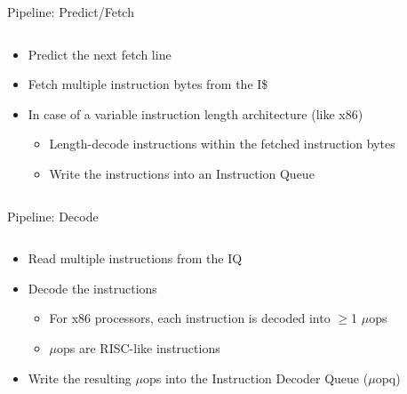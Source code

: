 \documentclass[aspectratio=169,12pt]{beamer}
\begin{document}
\begin{frame}{Pipeline: Predict/Fetch}
    \centering
    
    \vspace{0.5cm}
    \begin{columns}[T]
        \begin{column}{0.9\textwidth}
            \begin{itemize}
                \item Predict the next fetch line
                \item Fetch multiple instruction bytes from the I\$
                \item In case of a variable instruction length architecture (like x86)
                \begin{itemize}
                    \item Length-decode instructions within the fetched instruction bytes
                    \item Write the instructions into an Instruction Queue
                \end{itemize}
            \end{itemize}
        \end{column}
    \end{columns}
\end{frame}

\begin{frame}{Pipeline: Decode}
    \centering
    
    \vspace{0.5cm}
    \begin{columns}[T]
        \begin{column}{0.9\textwidth}
            \begin{itemize}
                \item Read multiple instructions from the IQ
                \item Decode the instructions
                \begin{itemize}
                    \item For x86 processors, each instruction is decoded into $\geq$1 $\mu$ops
                    \item $\mu$ops are RISC-like instructions
                \end{itemize}
                \item Write the resulting $\mu$ops into the Instruction Decoder Queue ($\mu$opq)
            \end{itemize}
        \end{column}
    \end{columns}
\end{frame}
\end{document}
